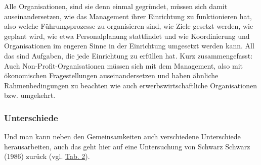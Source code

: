 \documentclass[
  letterpaper,
]{book}
\begin{document}
Alle Organisationen, sind sie denn einmal gegründet, müssen sich damit
auseinandersetzen, wie das Management ihrer Einrichtung zu funktionieren
hat, also welche Führungsprozesse zu organisieren sind, wie Ziele
gesetzt werden, wie geplant wird, wie etwa Personalplanung stattfindet
und wie Koordinierung und Organisationen im engeren Sinne in der
Einrichtung umgesetzt werden kann. All das sind Aufgaben, die jede
Einrichtung zu erfüllen hat. Kurz zusammengefasst: Auch
Non-Profit-Organisationen müssen sich mit dem Management, also mit
ökonomischen Fragestellungen auseinandersetzen und haben ähnliche
Rahmenbedingungen zu beachten wie auch erwerbswirtschaftliche
Organisationen bzw. umgekehrt.

\subsubsection{Unterschiede}\label{npounterschiede}

Und man kann neben den Gemeinsamkeiten auch verschiedene Unterschiede
herausarbeiten, auch das geht hier auf eine Untersuchung von Schwarz
Schwarz (1986) zurück (vgl. \hyperref[table2]{Tab. 2}).
\end{document}

